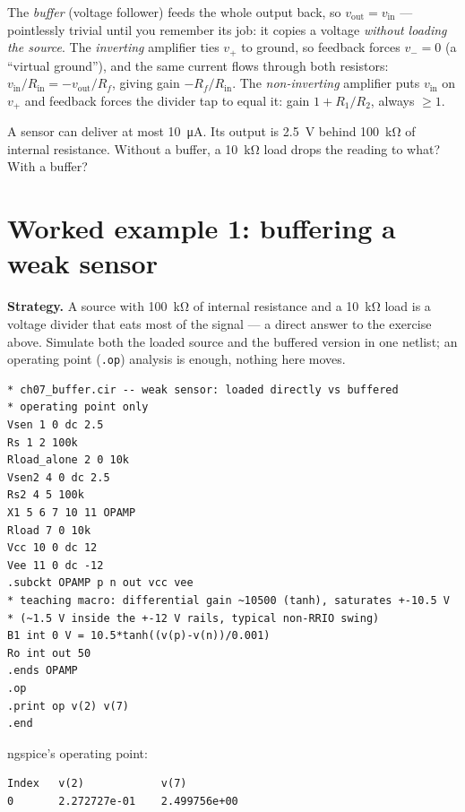 The \emph{buffer} (voltage follower) feeds the whole output back, so
$v_{\mathrm{out}} = v_{\mathrm{in}}$ — pointlessly trivial until you
remember its job: it copies a voltage \emph{without loading the source}.
The \emph{inverting} amplifier ties $v_+$ to ground, so feedback forces
$v_- = 0$ (a ``virtual ground''), and the same current flows through both
resistors: $v_{\mathrm{in}}/R_{\mathrm{in}} = -v_{\mathrm{out}}/R_f$, giving
gain $-R_f/R_{\mathrm{in}}$. The \emph{non-inverting} amplifier puts
$v_{\mathrm{in}}$ on $v_+$ and feedback forces the divider tap to equal
it: gain $1 + R_1/R_2$, always $\ge 1$.

\begin{exercise}
A sensor can deliver at most \qty{10}{\micro\ampere}. Its output is
\qty{2.5}{\volt} behind \qty{100}{\kilo\ohm} of internal resistance.
Without a buffer, a \qty{10}{\kilo\ohm} load drops the reading to what?
With a buffer?
\end{exercise}

\section{Worked example 1: buffering a weak sensor}
\label{sec:we-buffer}

\textbf{Strategy.} A source with \qty{100}{\kilo\ohm} of internal
resistance and a \qty{10}{\kilo\ohm} load is a voltage divider that eats
most of the signal — a direct answer to the exercise above. Simulate both
the loaded source and the buffered version in one netlist; an operating
point (\texttt{.op}) analysis is enough, nothing here moves.

\begin{lstlisting}[caption={\texttt{buffer.cir} --- a weak source, loaded directly vs through a buffer},label={lst:buffer},abovecaptionskip=0pt]
* ch07_buffer.cir -- weak sensor: loaded directly vs buffered
* operating point only
Vsen 1 0 dc 2.5
Rs 1 2 100k
Rload_alone 2 0 10k
Vsen2 4 0 dc 2.5
Rs2 4 5 100k
X1 5 6 7 10 11 OPAMP
Rload 7 0 10k
Vcc 10 0 dc 12
Vee 11 0 dc -12
.subckt OPAMP p n out vcc vee
* teaching macro: differential gain ~10500 (tanh), saturates +-10.5 V
* (~1.5 V inside the +-12 V rails, typical non-RRIO swing)
B1 int 0 V = 10.5*tanh((v(p)-v(n))/0.001)
Ro int out 50
.ends OPAMP
.op
.print op v(2) v(7)
.end
\end{lstlisting}

ngspice's operating point:

\begin{lstlisting}[caption={output of \texttt{ngspice -b buffer.cir} (both
sensors are identical \qty{2.5}{\volt} sources behind
\qty{100}{\kilo\ohm})},abovecaptionskip=0pt]
Index   v(2)            v(7)
0       2.272727e-01    2.499756e+00
\end{lstlisting}

